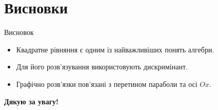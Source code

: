 \documentclass{beamer}
\begin{document}
\section{Висновки}
\begin{frame}{Висновок}
    \begin{itemize}
        \item Квадратне рівняння є одним із найважливіших понять алгебри.
        \item Для його розв’язування використовують дискримінант.
        \item Графічно розв’язки пов’язані з перетином параболи та осі $Ox$.
    \end{itemize}

    \vspace{0.6cm}
    \centering
    \textbf{\Large Дякую за увагу!}
\end{frame}
\end{document}
